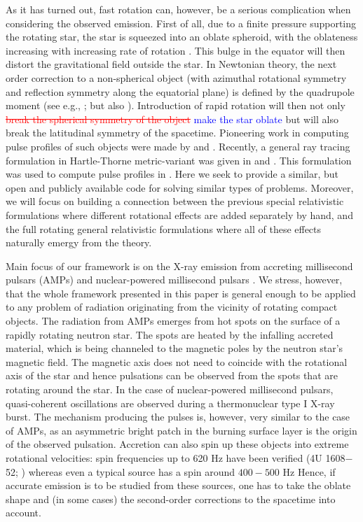 \documentclass{aa}
\newcommand{\refe}[1]{\textcolor{blue}{{#1}}}
\newcommand{\refedel}[1]{\textcolor{red}{\sout{#1}}}
\begin{document}
As it has turned out, fast rotation can, however, be a serious complication when considering the observed emission.
First of all, due to a finite pressure supporting the rotating star, the star is squeezed into an oblate spheroid, with the oblateness increasing with increasing rate of rotation \citep{CST94, MS99, MLC07, BBP13, aGM14}.
This bulge in the equator will then distort the gravitational field outside the star.
In Newtonian theory, the next order correction to a non-spherical object (with azimuthal rotational symmetry and reflection symmetry along the equatorial plane) is defined by the quadrupole moment (see e.g., \citealt{LP99}; but also \citealt{PA12}).
Introduction of rapid rotation will then not only \refedel{break the spherical symmetry of the object} \refe{make the star oblate} but will also break the latitudinal symmetry of the spacetime.
Pioneering work in computing pulse profiles of such objects were made by \citet{CL05} and \citet{CML07}.
Recently, a general ray tracing formulation in Hartle-Thorne metric-variant was given in \citet{PJ12} and \citet{BPO12}. 
This formulation was used to compute pulse profiles in \citet{PO14}.
Here we seek to provide a similar, but open and publicly available code for solving similar types of problems.
Moreover, we will focus on building a connection between the previous special relativistic formulations where different rotational effects are added separately by hand, and the full rotating general relativistic formulations where all of these effects naturally emergy from the theory.


Main focus of our framework is on the X-ray emission from accreting millisecond pulsars (AMPs) \citep{WvdK98, PW12} and nuclear-powered millisecond pulsars \citep{Watts12}.
We stress, however, that the whole framework presented in this paper is general enough to be applied to any problem of radiation originating from the vicinity of rotating compact objects. 
The radiation from AMPs emerges from hot spots on the surface of a rapidly rotating neutron star. The spots are heated by the infalling accreted material, which is being channeled to the magnetic poles by the neutron star's magnetic field.
The magnetic axis does not need to coincide with the rotational axis of the star and hence pulsations can be observed from the spots that are rotating around the star.
In the case of nuclear-powered millisecond pulsars, quasi-coherent oscillations are observed during a thermonuclear type I X-ray burst.
The mechanism producing the pulses is, however, very similar to the case of AMPs, as an asymmetric bright patch in the burning surface layer is the origin of the observed pulsation.
Accretion can also spin up these objects into extreme rotational velocities: spin frequencies up to 620 Hz have been verified (4U 1608$-$52; \citealt{MC02}) whereas even a typical source has a spin around $400-500$ Hz \citep{Watts12, PTR14}
Hence, if accurate emission is to be studied from these sources, one has to take the oblate shape and (in some cases) the second-order corrections to the spacetime into account.
\end{document}
